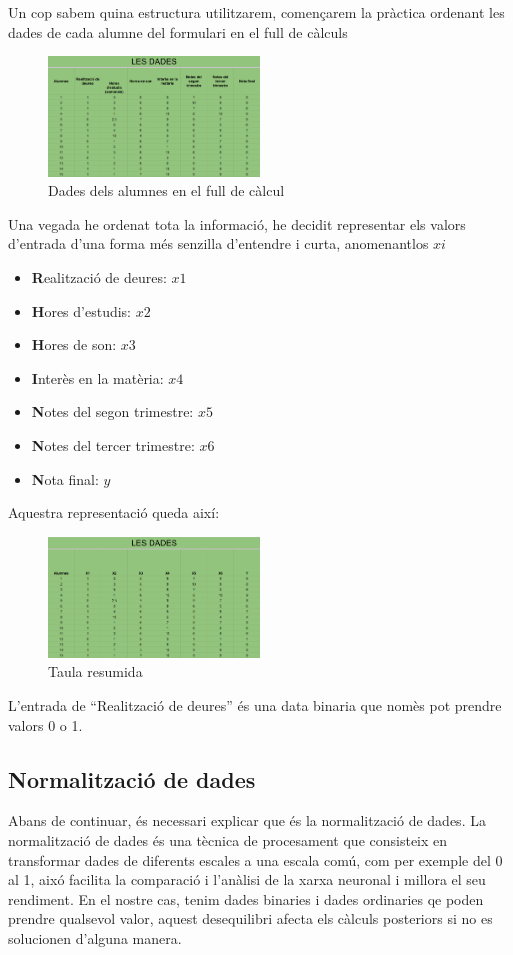 Un cop sabem quina estructura utilitzarem, començarem la pràctica ordenant les dades de cada alumne del formulari en el full de càlculs

\begin{figure}[H]
    \centering
    \includegraphics[width=0.5\textwidth]{./figures/Dades.png}
    \caption{Dades dels alumnes en el full de càlcul}
\end{figure}

Una vegada he ordenat tota la informació, he decidit representar els valors d'entrada d'una forma més senzilla d'entendre i curta, anomenantlos $xi$
\begin{itemize}
 \item \textbf Realització de deures: $x1$
 \item \textbf Hores d'estudis: $x2$
 \item \textbf Hores de son: $x3$
 \item \textbf Interès en la matèria: $x4$
 \item \textbf Notes del segon trimestre: $x5$
 \item \textbf Notes del tercer trimestre: $x6$
 \item \textbf Nota final: $y$
\end{itemize}

Aquestra representació queda així:

\begin{figure}[H]
    \centering
    \includegraphics[width=0.5\textwidth]{./figures/Dades_resumides.png}
    \caption{Taula resumida}
\end{figure}

L'entrada de ``Realització de deures'' és una data binaria que nomès pot prendre valors 0 o 1.
\subsection{Normalització de dades}
Abans de continuar, és necessari explicar que és la normalització de dades.
La normalització de dades és una tècnica de procesament que consisteix en transformar dades de diferents escales a una escala comú, com per exemple del 0 al 1, aixó facilita la comparació i l'anàlisi de la xarxa neuronal i millora el seu rendiment. En el nostre cas, tenim dades binaries i dades ordinaries qe poden prendre qualsevol valor, aquest desequilibri afecta els càlculs posteriors si no es solucionen d'alguna manera.

